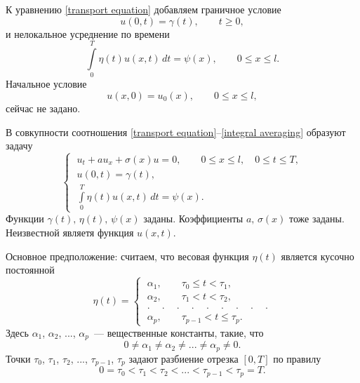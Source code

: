 \documentclass{article}
\renewcommand{\le}{\leqslant}
\renewcommand{\ge}{\geqslant}
\theoremstyle{definition}
\begin{document}
К уравнению \eqref{transport equation} добавляем граничное условие
\begin{equation} \label{boundary condition}
	u(0,t) = \gamma(t), \qquad t \ge 0,
\end{equation}
 и нелокальное усреднение по времени
\begin{equation} \label{integral averaging}
	\int\limits_{0}^{T} \eta(t) u(x, t)\,dt = \psi(x), 	\qquad 0 \le x \le l.
\end{equation}
Начальное условие 
\begin{equation*}
	u(x,0) = u_0(x), \qquad 0 \le x \le l,
\end{equation*}
сейчас не задано.

В совкупности соотношения \eqref{transport equation}--\eqref{integral averaging} образуют задачу
\begin{equation} \label{nonlocal problem}
\begin{cases}
	\; u_t + au_x + \sigma(x)u = 0, \qquad 0 \le x \le l, \quad 0 \le t \le T, \\[3mm]
	\; u(0,t) = \gamma(t), \\[1mm]
	\; \int\limits_{0}^{T} \eta(t) u(x,t)\,dt = \psi(x).
\end{cases}
\end{equation}
Функции $ \gamma(t), \, \eta(t), \, \psi(x)$ заданы.
Коэффициенты $ a, \, \sigma(x)$ тоже заданы. 
Неизвестной являетя функция $ u(x,t) $.

Основное предположение: считаем, что весовая функция $ \eta(t) $ является кусочно постоянной
\begin{equation} \label{eta(t)}
\eta(t) = 
	\begin{cases}
	\; \alpha_1, \qquad \tau_0 \le t < \tau_1, \\
	\; \alpha_2, \qquad \tau_1 < t < \tau_2, \\
	\; .\phantom{-}.\phantom{-}.\phantom{-}.\phantom{-}.\phantom{-}.\phantom{-}.\phantom{-}.\phantom{-}. \\
	\; \alpha_p, \qquad \tau_{p - 1} < t \le \tau_p.
	\end{cases}
\end{equation}
Здесь $\alpha_1$, $\alpha_2$, ..., $\alpha_p$~--- вещественные константы, такие, что
\begin{equation*}
	0 \not= \alpha_1 \not= \alpha_2 \not= ... \not= \alpha_p \not= 0.
\end{equation*}
Точки $\tau_0$, $\tau_1$, $\tau_2$, ..., $\tau_{p - 1}$, $\tau_p$ задают разбиение отрезка $[0,T]$ по правилу
\begin{equation*}
	0 = \tau_0 < \tau_1 < \tau_2 < ... < \tau_{p - 1} < \tau_p = T.
\end{equation*}
\end{document}
